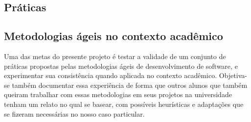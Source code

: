 \documentclass[a4paper,12pt,font=plain,header=plain]{abnt}
\begin{document}
    \subsection{Práticas}



    \subsection{Metodologias ágeis no contexto acadêmico}
      Uma das metas do presente projeto é testar a validade de um conjunto de práticas propostas pelas metodologias ágeis de desenvolvimento de software, e experimentar sua consistência quando aplicada no contexto acadêmico. Objetiva-se também documentar essa experiência de forma que outros alunos que também queiram trabalhar com essas metodologias em seus projetos na universidade tenham um relato no qual se basear, com possíveis heurísticas e adaptações que se fizeram necessárias no nosso caso particular.
\end{document}
